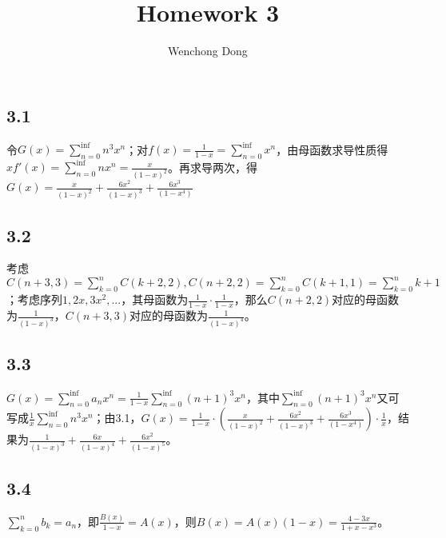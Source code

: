 \documentclass{article}
\title{Homework 3}
\author{Wenchong Dong}
\begin{document}
\begin{CJK}{UTF8}{gbsn}

\maketitle

\subsection*{3.1}

令$G(x) = \sum_{n=0}^{\inf} n^3 x^n$；对$f(x) = \frac{1}{1-x} = \sum_{n=0}^{\inf} x^n$，由母函数求导性质得$xf'(x) = \sum_{n=0}^{\inf}n x^n = \frac{x}{(1-x)^2}$。再求导两次，得$G(x) = \frac{x}{(1-x)^2} + \frac{6x^2}{(1-x)^3} + \frac{6x^3}{(1-x^4)}$

\subsection*{3.2}

考虑$C(n+3, 3) = \sum_{k=0}^{n}C(k+2, 2), C(n+2, 2) = \sum_{k=0}^{n}C(k+1, 1) = \sum_{k=0}^{n} k+1$；考虑序列$1, 2x, 3x^2, ...$，其母函数为$\frac{1}{1-x} \cdot \frac{1}{1-x}$，那么$C(n+2, 2)$对应的母函数为$\frac{1}{(1-x)^3}$，$C(n+3, 3)$对应的母函数为$\frac{1}{(1-x)^4}$。

\subsection*{3.3}

$G(x)=\sum_{n=0}^{\inf}a_n x^n=\frac{1}{1-x}\sum_{n=0}^{\inf}(n+1)^3 x^n$，其中$\sum_{n=0}^{\inf}(n+1)^3 x^n$又可写成$\frac{1}{x} \sum_{n=0}^{\inf}n^3 x^n$；由3.1，$G(x) = \frac{1}{1-x} \cdot (\frac{x}{(1-x)^2} + \frac{6x^2}{(1-x)^3} + \frac{6x^3}{(1-x^4)}) \cdot \frac{1}{x}$，结果为$\frac{1}{(1-x)^3} + \frac{6x}{(1-x)^4} + \frac{6x^2}{(1-x)^5}$。

\subsection*{3.4}

$\sum_{k=0}^{n} b_k = a_n$，即$\frac{B(x)}{1-x} = A(x)$，则$B(x) = A(x)(1-x) = \frac{4-3x}{1+x-x^3}$。

\end{CJK}
\end{document}
